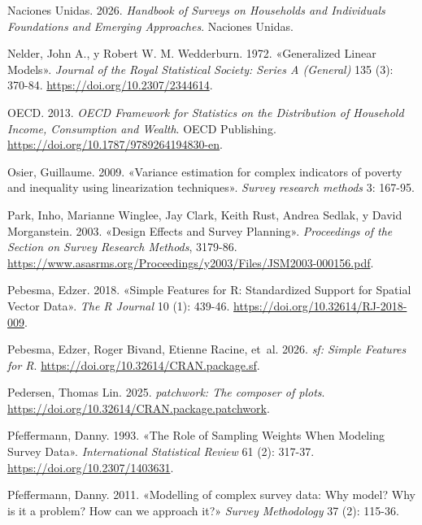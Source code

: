 \documentclass[
  spanish,
  11pt,
  letterpaper,
  oneside,
  open=any]{scrbook}
\newlength{\cslhangindent}
\newenvironment{CSLReferences}[2] %
 {\begin{list}{}{%
  \setlength{\itemindent}{0pt}
  \setlength{\leftmargin}{0pt}
  \setlength{\parsep}{0pt}
  \ifodd #1
   \setlength{\leftmargin}{\cslhangindent}
   \setlength{\itemindent}{-1\cslhangindent}
  \fi
  \setlength{\itemsep}{#2\baselineskip}}}
 {\end{list}}
\begin{document}
\begin{CSLReferences}{1}{1}
Naciones Unidas. 2026. \emph{Handbook of Surveys on Households and
Individuals Foundations and Emerging Approaches}. Naciones Unidas.

Nelder, John A., y Robert W. M. Wedderburn. 1972. {«Generalized Linear
Models»}. \emph{Journal of the Royal Statistical Society: Series A
(General)} 135 (3): 370-84. \url{https://doi.org/10.2307/2344614}.

OECD. 2013. \emph{OECD Framework for Statistics on the Distribution of
Household Income, Consumption and Wealth}. OECD Publishing.
\url{https://doi.org/10.1787/9789264194830-en}.

Osier, Guillaume. 2009. {«Variance estimation for complex indicators of
poverty and inequality using linearization techniques»}. \emph{Survey
research methods} 3: 167-95.

Park, Inho, Marianne Winglee, Jay Clark, Keith Rust, Andrea Sedlak, y
David Morganstein. 2003. {«Design Effects and Survey Planning»}.
\emph{Proceedings of the Section on Survey Research Methods}, 3179-86.
\url{https://www.asasrms.org/Proceedings/y2003/Files/JSM2003-000156.pdf}.

Pebesma, Edzer. 2018. {«Simple Features for R: Standardized Support for
Spatial Vector Data»}. \emph{The R Journal} 10 (1): 439-46.
\url{https://doi.org/10.32614/RJ-2018-009}.

Pebesma, Edzer, Roger Bivand, Etienne Racine, et~al. 2026. \emph{sf:
Simple Features for R}. \url{https://doi.org/10.32614/CRAN.package.sf}.

Pedersen, Thomas Lin. 2025. \emph{patchwork: The composer of plots}.
\url{https://doi.org/10.32614/CRAN.package.patchwork}.

Pfeffermann, Danny. 1993. {«The Role of Sampling Weights When Modeling
Survey Data»}. \emph{International Statistical Review} 61 (2): 317-37.
\url{https://doi.org/10.2307/1403631}.

Pfeffermann, Danny. 2011. {«Modelling of complex survey data: {W}hy
model? {W}hy is it a problem? {H}ow can we approach it?»} \emph{Survey
Methodology} 37 (2): 115-36.


\end{CSLReferences}
\end{document}
